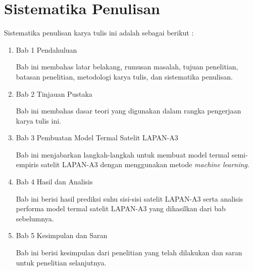 \section{Sistematika Penulisan}

Sistematika penulisan karya tulis ini adalah sebagai berikut :

\begin{enumerate}
\item Bab 1 Pendahuluan

Bab ini membahas latar belakang, rumusan masalah, tujuan penelitian, batasan
penelitian, metodologi karya tulis, dan sistematika penulisan.

\item Bab 2 Tinjauan Pustaka

Bab ini membahas dasar teori yang digunakan dalam rangka pengerjaan karya tulis ini.

\item Bab 3 Pembuatan Model Termal Satelit LAPAN-A3

Bab ini menjabarkan langkah-langkah untuk membuat model termal semi-empiris
		satelit LAPAN-A3 dengan menggunakan metode \textit{machine learning}.

\item Bab 4 Hasil dan Analisis

Bab ini berisi hasil prediksi suhu sisi-sisi satelit LAPAN-A3 serta analisis performa model termal satelit LAPAN-A3 yang dihasilkan dari bab sebelumnya.

\item Bab 5 Kesimpulan dan Saran

Bab ini berisi kesimpulan dari penelitian yang telah dilakukan dan saran
untuk penelitian selanjutnya.
\end{enumerate}
